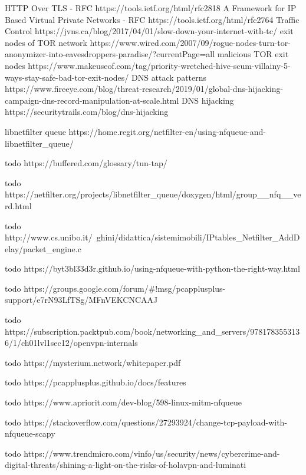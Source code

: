 \documentclass[12pt]{article}
\begin{document}
	\pagebreak

	
	\begin{thebibliography}{1}
			HTTP Over TLS - RFC
			https://tools.ietf.org/html/rfc2818
			A Framework for IP Based Virtual Private Networks - RFC
			https://tools.ietf.org/html/rfc2764
			Traffic Control
			https://jvns.ca/blog/2017/04/01/slow-down-your-internet-with-tc/
			exit nodes of TOR network
			https://www.wired.com/2007/09/rogue-nodes-turn-tor-anonymizer-into-eavesdroppers-paradise/?currentPage=all
			malicious TOR exit nodes
			https://www.makeuseof.com/tag/priority-wretched-hive-scum-villainy-5-ways-stay-safe-bad-tor-exit-nodes/
			DNS attack patterns
			https://www.fireeye.com/blog/threat-research/2019/01/global-dns-hijacking-campaign-dns-record-manipulation-at-scale.html
			DNS hijacking
			https://securitytrails.com/blog/dns-hijacking

			libnetfilter queue
			https://home.regit.org/netfilter-en/using-nfqueue-and-libnetfilter_queue/
		
			todo
			https://buffered.com/glossary/tun-tap/
		
			todo
			https://netfilter.org/projects/libnetfilter_queue/doxygen/html/group__nfq__verd.html

		todo
		http://www.cs.unibo.it/~ghini/didattica/sistemimobili/IPtables_Netfilter_AddDelay/packet_engine.c

		todo
		https://byt3bl33d3r.github.io/using-nfqueue-with-python-the-right-way.html

		todo
		https://groups.google.com/forum/#!msg/pcapplusplus-support/e7rN93LfTSg/MFnVEKCNCAAJ

		todo
		https://subscription.packtpub.com/book/networking_and_servers/9781783553136/1/ch01lvl1sec12/openvpn-internals

		todo
		https://mysterium.network/whitepaper.pdf

		todo
		https://pcapplusplus.github.io/docs/features

		todo
		https://www.apriorit.com/dev-blog/598-linux-mitm-nfqueue

		todo
		https://stackoverflow.com/questions/27293924/change-tcp-payload-with-nfqueue-scapy

		todo
		https://www.trendmicro.com/vinfo/us/security/news/cybercrime-and-digital-threats/shining-a-light-on-the-risks-of-holavpn-and-luminati

	\end{thebibliography}
		
	\pagebreak
	
	
\end{document}

